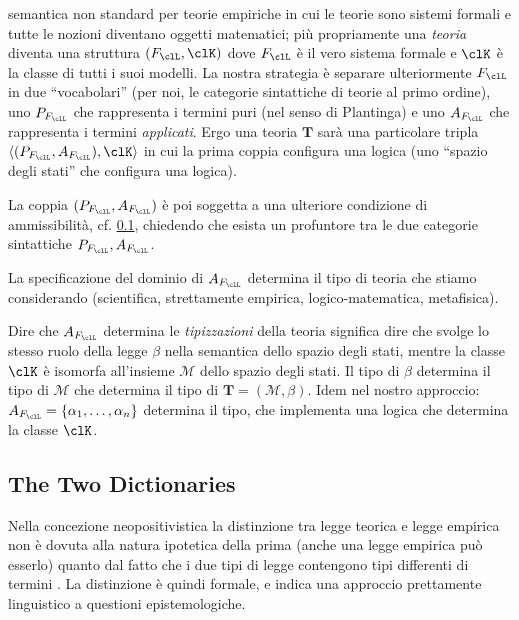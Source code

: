 \documentclass[a4paper]{../birkjour}
\newcommand{\bk}[1]{\langle #1\rangle}
\begin{document}
semantica non standard per teorie empiriche in cui le teorie sono sistemi formali e tutte le nozioni diventano oggetti matematici; più propriamente una \emph{teoria} diventa una struttura $(F_\clL, \clK)$ dove $F_\clL$ è il vero sistema formale e $\clK$ è la classe di tutti i suoi modelli. La nostra strategia è separare ulteriormente $F_\clL$ in due ``vocabolari'' (per noi, le categorie sintattiche di teorie al primo ordine), uno $P_{F_\clL}$ che rappresenta i termini puri (nel senso di Plantinga) e uno $A_{F_\clL}$ che rappresenta i termini \emph{applicati}. Ergo una teoria $\mathbf{T}$ sarà una particolare tripla $\bk{(P_{F_\clL},A_{F_\clL}), \clK}$ in cui la prima coppia configura una logica (uno ``spazio degli stati'' che configura una logica). 

La coppia $(P_{F_\clL},A_{F_\clL})$ è poi soggetta a una ulteriore condizione di ammissibilità, cf. \ref{}, chiedendo che esista un profuntore tra le due categorie sintattiche $P_{F_\clL},A_{F_\clL}$.

La specificazione del dominio di $A_{F_\clL}$ determina il tipo di teoria che stiamo considerando (scientifica, strettamente empirica, logico-matematica, metafisica).

Dire che $A_{F_\clL}$ determina le \emph{tipizzazioni} della teoria significa 
dire che svolge lo stesso ruolo della legge $\beta$ nella semantica dello spazio degli 
stati, mentre la classe $\clK$ è isomorfa all'insieme $\mathcal{M}$ dello spazio 
degli stati. Il tipo di $\beta$ determina il tipo di $\mathcal{M}$ che determina il 
tipo di $\mathbf{T} = (\mathcal{M}, \beta)$. Idem nel nostro approccio: $A_{F_\clL} 
= \{\alpha_1,\dots,\alpha_n\}$ determina il tipo, che implementa una logica che determina 
la classe $\clK$. 

\subsection{The Two Dictionaries}
Nella concezione neopositivistica la distinzione tra legge teorica e legge empirica non è dovuta alla natura ipotetica della prima (anche una legge empirica può esserlo) quanto dal fatto che i due tipi di legge contengono tipi differenti di termini \cite{}. La distinzione è quindi formale, e indica una approccio prettamente linguistico a questioni epistemologiche. 
\end{document}
